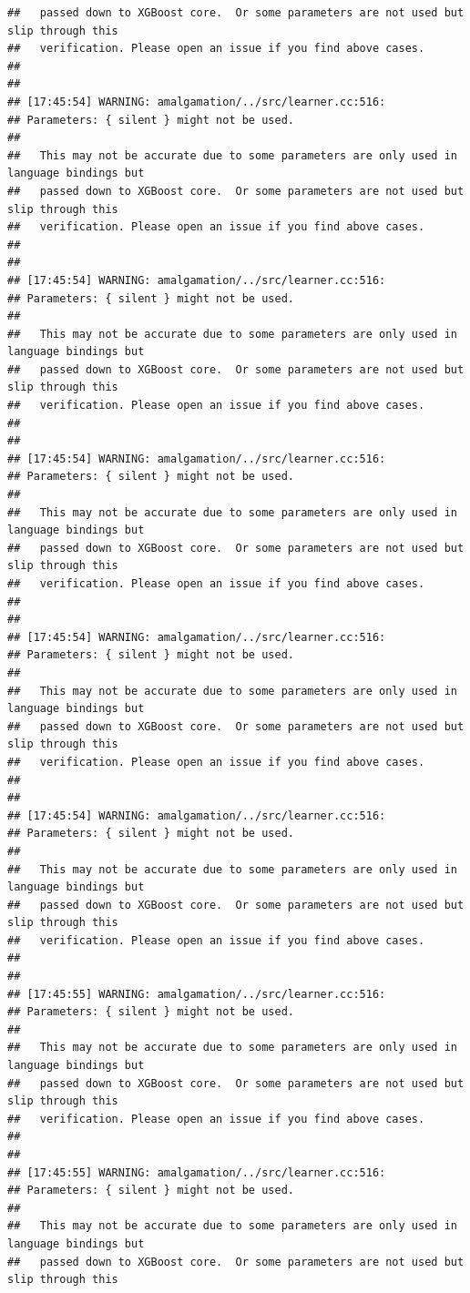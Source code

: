 \documentclass[AMS,STIX2COL]{WileyNJD-v2}\usepackage[]{graphicx}\usepackage[]{color}
\makeatletter
\newenvironment{kframe}{%
 \def\at@end@of@kframe{}%
 \ifinner\ifhmode%
  \def\at@end@of@kframe{\end{minipage}}%
  \begin{minipage}{\columnwidth}%
 \fi\fi%
 \def\FrameCommand##1{\hskip\@totalleftmargin \hskip-\fboxsep
 \colorbox{shadecolor}{##1}\hskip-\fboxsep
     \hskip-\linewidth \hskip-\@totalleftmargin \hskip\columnwidth}%
 \MakeFramed {\advance\hsize-\width
   \@totalleftmargin\z@ \linewidth\hsize
   \@setminipage}}%
 {\par\unskip\endMakeFramed%
 \at@end@of@kframe}
\newenvironment{knitrout}{}{} %
\makeatother
\begin{document}
\begin{knitrout}
\begin{kframe}
\begin{verbatim}
##   passed down to XGBoost core.  Or some parameters are not used but slip through this
##   verification. Please open an issue if you find above cases.
## 
## 
## [17:45:54] WARNING: amalgamation/../src/learner.cc:516: 
## Parameters: { silent } might not be used.
## 
##   This may not be accurate due to some parameters are only used in language bindings but
##   passed down to XGBoost core.  Or some parameters are not used but slip through this
##   verification. Please open an issue if you find above cases.
## 
## 
## [17:45:54] WARNING: amalgamation/../src/learner.cc:516: 
## Parameters: { silent } might not be used.
## 
##   This may not be accurate due to some parameters are only used in language bindings but
##   passed down to XGBoost core.  Or some parameters are not used but slip through this
##   verification. Please open an issue if you find above cases.
## 
## 
## [17:45:54] WARNING: amalgamation/../src/learner.cc:516: 
## Parameters: { silent } might not be used.
## 
##   This may not be accurate due to some parameters are only used in language bindings but
##   passed down to XGBoost core.  Or some parameters are not used but slip through this
##   verification. Please open an issue if you find above cases.
## 
## 
## [17:45:54] WARNING: amalgamation/../src/learner.cc:516: 
## Parameters: { silent } might not be used.
## 
##   This may not be accurate due to some parameters are only used in language bindings but
##   passed down to XGBoost core.  Or some parameters are not used but slip through this
##   verification. Please open an issue if you find above cases.
## 
## 
## [17:45:54] WARNING: amalgamation/../src/learner.cc:516: 
## Parameters: { silent } might not be used.
## 
##   This may not be accurate due to some parameters are only used in language bindings but
##   passed down to XGBoost core.  Or some parameters are not used but slip through this
##   verification. Please open an issue if you find above cases.
## 
## 
## [17:45:55] WARNING: amalgamation/../src/learner.cc:516: 
## Parameters: { silent } might not be used.
## 
##   This may not be accurate due to some parameters are only used in language bindings but
##   passed down to XGBoost core.  Or some parameters are not used but slip through this
##   verification. Please open an issue if you find above cases.
## 
## 
## [17:45:55] WARNING: amalgamation/../src/learner.cc:516: 
## Parameters: { silent } might not be used.
## 
##   This may not be accurate due to some parameters are only used in language bindings but
##   passed down to XGBoost core.  Or some parameters are not used but slip through this

\end{verbatim}
\end{kframe}
\end{knitrout}
\end{document}
